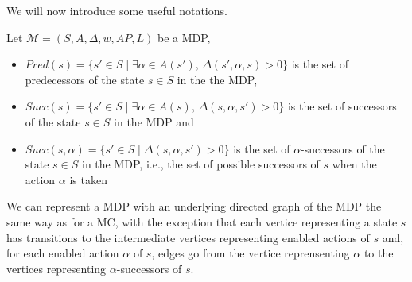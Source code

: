 We will now introduce some useful notations.

\begin{notation}
  Let $\mathcal{M}=(S, A, \Delta, w, AP, L)$ be a MDP,
  \begin{itemize}
    \item $Pred(s) = \{ s' \in S \; | \; \exists \alpha \in A(s'), \, \Delta(s', \alpha, s) > 0 \}$ is the set of predecessors of the state $s \in S$ in the the MDP,
    \item $Succ(s) = \{ s' \in S \; | \; \exists \alpha \in A(s), \, \Delta(s, \alpha, s') > 0 \}$ is the set of successors of the state $s \in S$ in the MDP and
    \item $Succ(s, \alpha) = \{ s' \in S \; | \; \Delta(s, \alpha, s') > 0 \}$
      is the set of $\alpha$-successors of the state $s \in S$ in the MDP, i.e., the set of possible successors of $s$ when the action $\alpha$ is taken
  \end{itemize}
\end{notation}

We can represent a MDP with an underlying directed graph of the MDP the same way as for a MC, with the exception that each vertice representing a state $s$ has transitions to the intermediate vertices representing enabled actions of $s$ and, for each enabled action $\alpha$ of $s$, edges go from the vertice reprensenting $\alpha$ to the vertices representing $\alpha$-successors of $s$.

